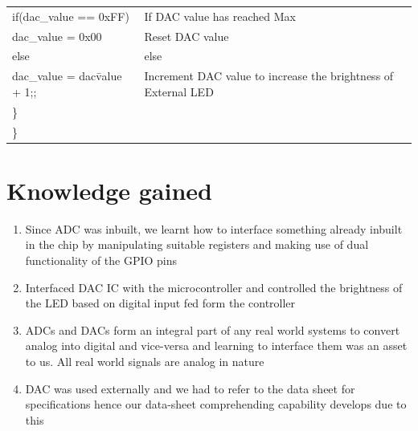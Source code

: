 \documentclass[12pt, letterpaper]{article}
\begin{document}
\begin{longtable}{|p{8cm}||p{6cm}|}
      
      \hspace{0.3cm} if(dac\_value == 0xFF) & If DAC value has reached Max\\
        \hspace{0.5cm}     dac\_value = 0x00 & Reset DAC value\\ 
        \hspace{0.3cm} else & else\\
        \hspace{0.5cm}    dac\_value = dac\=value + 1;; & Increment DAC value to increase the brightness of External LED\\
        \hspace{0.1cm} \} & \\

            \} & \\

\end{longtable}


\newpage

\section{Knowledge gained}

\begin{enumerate}
	\item Since ADC was inbuilt, we learnt how to interface something already inbuilt in the chip by manipulating suitable registers and making use of dual functionality of the GPIO pins
	
	\item Interfaced DAC IC with the microcontroller and controlled the brightness of the LED based on digital input fed form the controller 
	
	\item ADCs and DACs form an integral part of any real world systems to convert analog into digital and vice-versa and learning to interface them was an asset to us. All real world signals are analog in nature
	
	\item DAC was used externally and we had to refer to the data sheet for specifications hence our data-sheet comprehending capability develops due to this
\end{enumerate}
\end{document}
